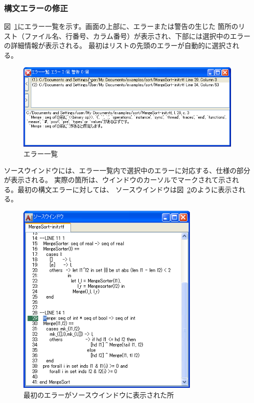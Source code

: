 \documentclass[\pformat,12pt]{jarticle}
\newcommand{\guicmd}[1]{{\gt #1}}
\begin{document}
\subsubsection{構文エラーの修正}


図~\ref{fig:error}に\guicmd{エラー一覧}を示す。画面の上部に、エラーまたは警告の生じた
箇所のリスト（ファイル名、行番号、カラム番号）が表示され、下部には選択中のエラーの詳細情報が表示される。
最初はリストの先頭のエラーが自動的に選択される。

\begin{figure}[tbh]
\begin{center}
\includegraphics[width=\textwidth]{errorList-pp.png}
\caption{エラー一覧}
\label{fig:error}
\end{center}
\end{figure}

\guicmd{ソースウインドウ}には、エラー一覧内で選択中のエラーに対応する、仕様の部分が表示される。
実際の箇所は、ウインドウのカーソルでマークされて示される。最初の構文エラーに対しては、
\guicmd{ソースウインドウ}は図~\ref{fig:source1}のように表示される。

\begin{figure}[tbh]
\begin{center}
\includegraphics[width=9cm]{sourceWindow-pp.png}
\caption{最初のエラーがソースウインドウに表示された所}
\label{fig:source1}
\end{center}
\end{figure}
\end{document}
